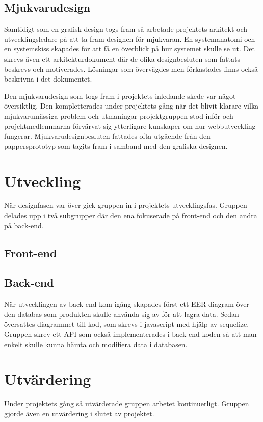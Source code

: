 \subsection{Mjukvarudesign}
Samtidigt som en grafisk design togs fram så arbetade projektets arkitekt och utvecklingsledare på att ta fram designen för mjukvaran. En systemanatomi och en systemskiss skapades för att få en överblick på hur systemet skulle se ut. Det skrevs även ett arkitekturdokument där de olika designbesluten som fattats beskrevs och motiverades. Lösningar som övervägdes men förkastades finns också beskrivna i det dokumentet.

Den mjukvarudesign som togs fram i projektets inledande skede var något översiktlig. Den kompletterades under projektets gång när det blivit klarare vilka mjukvarumässiga problem och utmaningar projektgruppen stod inför och projektmedlemmarna förvärvat sig ytterligare kunskaper om hur webbutveckling fungerar. Mjukvarudesignbesluten fattades ofta utgående från den pappersprototyp som tagits fram i samband med den grafiska designen. 

\section{Utveckling}
När designfasen var över gick gruppen in i projektets utvecklingsfas. Gruppen delades upp i två subgrupper där den ena fokuserade på front-end och den andra på back-end.

\subsection{Front-end}

\subsection{Back-end}
När utvecklingen av back-end kom igång skapades först ett EER-diagram över den databas som produkten skulle använda sig av för att lagra data. 
Sedan översattes diagrammet till kod, som skrevs i javascript med hjälp av sequelize. 
Gruppen skrev ett API som också implementerades i back-end koden så att man enkelt skulle kunna hämta och modifiera data i databasen.

\section{Utvärdering}
Under projektets gång så utvärderade gruppen arbetet kontinuerligt. Gruppen gjorde även en utvärdering i slutet av projektet.

